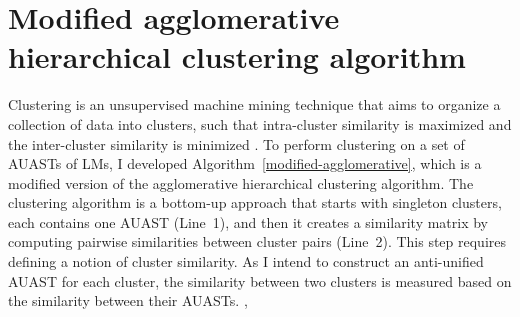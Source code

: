 \section{Modified agglomerative hierarchical clustering algorithm} \label{m-clustering-alg}
Clustering is an unsupervised machine mining technique that aims to organize a collection of data into clusters, such that intra-cluster similarity is maximized and the inter-cluster similarity is minimized \cite{karypis1999chameleon,grira2004unsupervised}. 
To perform clustering on a set of AUASTs of LMs, I developed Algorithm~\ref{modified-agglomerative}, which is a modified version of the agglomerative hierarchical clustering algorithm. The clustering algorithm is a bottom-up approach that starts with singleton clusters, each contains one AUAST (Line~1), and then it creates a similarity matrix by computing pairwise similarities between cluster pairs (Line~2). This step requires defining a notion of cluster similarity. As I intend to construct an anti-unified AUAST for each cluster, the similarity between two clusters is measured based on the similarity between their AUASTs.
,



